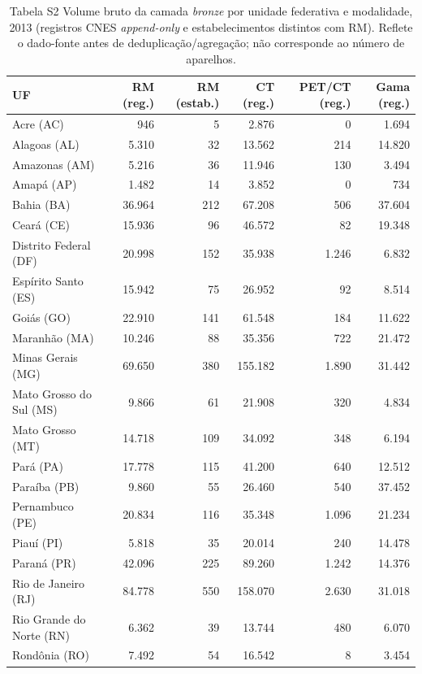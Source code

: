 \documentclass[11pt,a4paper]{article}
\begin{document}
\begin{table}[htbp]\centering\small
\caption{Tabela S2 \textendash{} Volume bruto da camada \emph{bronze}
por unidade federativa e modalidade, 2013 (registros
CNES \emph{append-only} e estabelecimentos distintos com RM). Reflete o
dado-fonte antes de deduplicação/agregação; não corresponde ao número
de aparelhos.}
\setlength{\tabcolsep}{6pt}
\begin{tabular}{l r r r r r}
\toprule
\textbf{UF} & \textbf{RM (reg.)} & \textbf{RM (estab.)} & \textbf{CT (reg.)} & \textbf{PET/CT (reg.)} & \textbf{Gama (reg.)} \\
\midrule
Acre (AC) & 946 & 5 & 2.876 & 0 & 1.694 \\
Alagoas (AL) & 5.310 & 32 & 13.562 & 214 & 14.820 \\
Amazonas (AM) & 5.216 & 36 & 11.946 & 130 & 3.494 \\
Amapá (AP) & 1.482 & 14 & 3.852 & 0 & 734 \\
Bahia (BA) & 36.964 & 212 & 67.208 & 506 & 37.604 \\
Ceará (CE) & 15.936 & 96 & 46.572 & 82 & 19.348 \\
Distrito Federal (DF) & 20.998 & 152 & 35.938 & 1.246 & 6.832 \\
Espírito Santo (ES) & 15.942 & 75 & 26.952 & 92 & 8.514 \\
Goiás (GO) & 22.910 & 141 & 61.548 & 184 & 11.622 \\
Maranhão (MA) & 10.246 & 88 & 35.356 & 722 & 21.472 \\
Minas Gerais (MG) & 69.650 & 380 & 155.182 & 1.890 & 31.442 \\
Mato Grosso do Sul (MS) & 9.866 & 61 & 21.908 & 320 & 4.834 \\
Mato Grosso (MT) & 14.718 & 109 & 34.092 & 348 & 6.194 \\
Pará (PA) & 17.778 & 115 & 41.200 & 640 & 12.512 \\
Paraíba (PB) & 9.860 & 55 & 26.460 & 540 & 37.452 \\
Pernambuco (PE) & 20.834 & 116 & 35.348 & 1.096 & 21.234 \\
Piauí (PI) & 5.818 & 35 & 20.014 & 240 & 14.478 \\
Paraná (PR) & 42.096 & 225 & 89.260 & 1.242 & 14.376 \\
Rio de Janeiro (RJ) & 84.778 & 550 & 158.070 & 2.630 & 31.018 \\
Rio Grande do Norte (RN) & 6.362 & 39 & 13.744 & 480 & 6.070 \\
Rondônia (RO) & 7.492 & 54 & 16.542 & 8 & 3.454 \\

\end{tabular}
\end{table}
\end{document}
